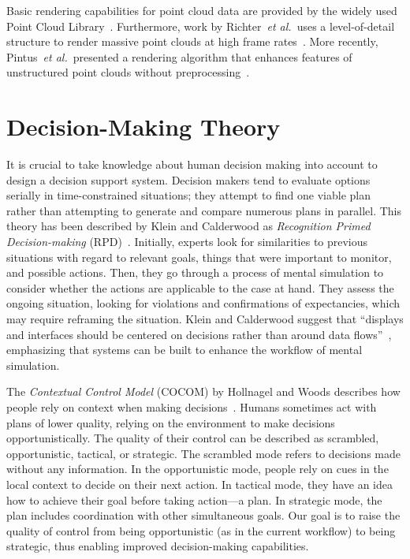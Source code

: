 \documentclass{egpubl}
\def\etal{\textit{et al.}}
\begin{document}
 Basic rendering capabilities for point cloud data are provided by the widely used Point Cloud Library~\cite{Rusu11ICRA}. Furthermore, work by Richter~\etal\ uses a level-of-detail structure to render massive point clouds at high frame rates~\cite{Richter:2010:ORV:1811158.1811178}. More recently, Pintus~\etal\ presented a rendering algorithm that enhances features of unstructured point clouds without preprocessing~\cite{Pintus:2011:RRM:2384495.2384513}.


\section{Decision-Making Theory} \label{sec:theory}
It is crucial to take knowledge about human decision making into account to design a decision support system. Decision makers tend to evaluate options serially in time-constrained situations; they attempt to find one viable plan rather than attempting to generate and compare numerous plans in parallel. This theory has been described by Klein and Calderwood as \emph{Recognition Primed Decision-making} (RPD)~\cite{KleinCalderwood}. Initially, experts look for similarities to previous situations with regard to relevant goals, things that were important to monitor, and possible actions. Then, they go through a process of mental simulation to consider whether the actions are applicable to the case at hand. They assess the ongoing situation, looking for violations and confirmations of expectancies, which may require reframing the situation. Klein and Calderwood suggest that ``displays and interfaces should be centered on decisions rather than around data flows''~\cite{KleinCalderwood}, emphasizing that systems can be built to enhance the workflow of mental simulation. 

The \emph{Contextual Control Model} (COCOM) by Hollnagel and Woods describes how people rely on context when making decisions~\cite{hollnagel2005joint}. Humans sometimes act with plans of lower quality, relying on the environment to make decisions opportunistically. The quality of their control can be described as scrambled, opportunistic, tactical, or strategic. The scrambled mode refers to decisions made without any information. In the opportunistic mode, people rely on cues in the local context to decide on their next action. In tactical mode, they have an idea how to achieve their goal before taking action---a plan. In strategic mode, the plan includes coordination with other simultaneous goals. Our goal is to raise the quality of control from being opportunistic (as in the current workflow) to being strategic, thus enabling improved decision-making capabilities.
\end{document}

